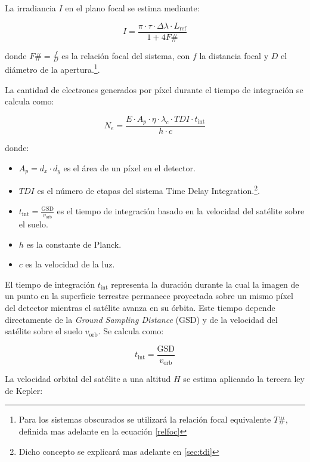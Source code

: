 La irradiancia \( I \) en el plano focal se estima mediante:

\begin{equation}
I = \frac{\pi \cdot \tau \cdot \Delta \lambda \cdot L_{\mathrm{ref}}}{1 + 4F\#}
\end{equation}

donde \( F\# = \frac{f}{D} \) es la relación focal del sistema, con \( f \) la distancia focal y \( D \) el diámetro de la apertura.\footnote{Para los sistemas obscurados se utilizará la relación focal equivalente $T\#$, definida mas adelante en la ecuación \ref{relfoc}}.

La cantidad de electrones generados por píxel durante el tiempo de integración se calcula como:

\begin{equation}
N_e = \frac{E \cdot A_p \cdot \eta \cdot \lambda_c \cdot TDI \cdot t_{\mathrm{int}}}{h \cdot c}
\end{equation}

donde:
\begin{itemize}
    \item \( A_p = d_x \cdot d_y \) es el área de un píxel en el detector.
    \item \( TDI \) es el número de etapas del sistema Time Delay Integration.\footnote{Dicho concepto se explicará mas adelante en \ref{sec:tdi}}.
    \item \( t_{\mathrm{int}} = \frac{\mathrm{GSD}}{v_{\mathrm{orb}}} \) es el tiempo de integración basado en la velocidad del satélite sobre el suelo.
    \item \( h \) es la constante de Planck.
    \item \( c \) es la velocidad de la luz.
\end{itemize}

El tiempo de integración \( t_{\mathrm{int}} \) representa la duración durante la cual la imagen de un punto en la superficie terrestre permanece proyectada sobre un mismo píxel del detector mientras el satélite avanza en su órbita. Este tiempo depende directamente de la \textit{Ground Sampling Distance} (GSD) y de la velocidad del satélite sobre el suelo \( v_{\mathrm{orb}} \). Se calcula como:

\begin{equation}
t_{\mathrm{int}} = \frac{\mathrm{GSD}}{v_{\mathrm{orb}}}
\end{equation}

La velocidad orbital del satélite a una altitud \( H\) se estima aplicando la tercera ley de Kepler:

